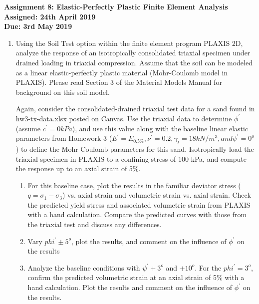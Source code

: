 \documentclass[a4paper,12pt]{article}
\begin{document}
\begin{centering}
	\textbf{
		Assignment 8: Elastic-Perfectly Plastic Finite Element Analysis\\
		Assigned: 24th April 2019\\
		Due: 3rd May 2019\\
	}
\end{centering}

\vspace{1em}
 
\begin{enumerate}

	\item  Using the Soil Test option within the finite element program PLAXIS 2D, analyze the
	response of an isotropically consolidated triaxial specimen under drained loading in triaxial
	compression. Assume that the soil can be modeled as a linear elastic-perfectly plastic
	material (Mohr-Coulomb model in PLAXIS). Please read Section 3 of the Material Models
	Manual for background on this soil model.
	
	Again, consider the consolidated-drained triaxial test data for a sand found in hw3-tx-data.xlsx posted on Canvas. Use the triaxial data to determine $\phi^\prime$ (assume $c^\prime = 0 kPa$), and use this value along with the baseline linear elastic parameters from Homework 3 ($E^\prime = E_{0.5\%}, \nu^\prime = 0.2, \gamma_t = 18 kN/m^3, and \psi^\prime = 0^o$) to define the Mohr-Coulomb parameters for this sand.
	Isotropically load the triaxial specimen in PLAXIS to a confining stress of 100 kPa, and
	compute the response up to an axial strain of 5\%.
	
	\begin{enumerate}
		\item For this baseline case, plot the results in the familiar deviator stress ($q = \sigma_1 - \sigma_3$) vs. axial
		strain and volumetric strain vs. axial strain. Check the predicted yield stress and
		associated volumetric strain from PLAXIS with a hand calculation. Compare the
		predicted curves with those from the triaxial test and discuss any differences.
		
		\item Vary $phi^\prime \pm 5^o$, plot the results, and comment on the influence of $\phi^\prime$ on the results

		\item Analyze the baseline conditions with $\psi^\prime + 3^o$ and $+10^o$. For the  $phi^\prime = 3^o$, confirm the
		predicted volumetric strain at an axial strain of 5\% with a hand calculation. Plot the
		results and comment on the influence of $\phi^\prime$ on the results.
		

\end{enumerate}
\end{enumerate}
\end{document}
